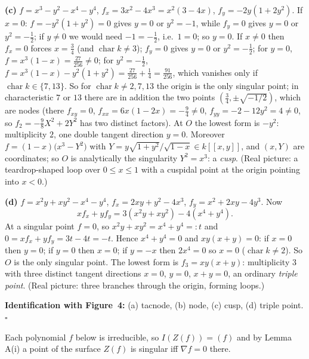 \documentclass[11pt]{article}
\begin{document}
\textbf{(c)} $f=x^3-y^2-x^4-y^4$, $f_x=3x^2-4x^3=x^2(3-4x)$, $f_y=-2y(1+2y^2)$. If $x=0$: $f=-y^2(1+y^2)=0$ gives $y=0$ or $y^2=-1$, while $f_y=0$ gives $y=0$ or $y^2=-\tfrac12$; if $y\ne0$ we would need $-1=-\tfrac12$, i.e.\ $1=0$; so $y=0$. If $x\ne0$ then $f_x=0$ forces $x=\tfrac34$ (and $\operatorname{char}k\neq3$); $f_y=0$ gives $y=0$ or $y^2=-\tfrac12$; for $y=0$, $f=x^3(1-x)=\tfrac{27}{256}\ne0$; for $y^2=-\tfrac12$, $f=x^3(1-x)-y^2(1+y^2)=\tfrac{27}{256}+\tfrac14=\tfrac{91}{256}$, which vanishes only if $\operatorname{char}k\in\{7,13\}$. So for $\operatorname{char}k\ne2,7,13$ the origin is the only singular point; in characteristic $7$ or $13$ there are in addition the two points $(\tfrac34,\pm\sqrt{-1/2})$, which are nodes (there $f_{xy}=0$, $f_{xx}=6x(1-2x)=-\tfrac94\neq0$, $f_{yy}=-2-12y^2=4\neq0$, so $f_2=-\tfrac98X^2+2Y^2$ has two distinct factors). At $O$ the lowest form is $-y^2$: multiplicity $2$, one double tangent direction $y=0$. Moreover $f=(1-x)\bigl(x^3-Y^2\bigr)$ with $Y=y\sqrt{1+y^2}/\sqrt{1-x}\in k[[x,y]]$, and $(x,Y)$ are coordinates; so $O$ is analytically the singularity $Y^2=x^3$: a \emph{cusp}. (Real picture: a teardrop-shaped loop over $0\le x\le1$ with a cuspidal point at the origin pointing into $x<0$.)

\textbf{(d)} $f=x^2y+xy^2-x^4-y^4$, $f_x=2xy+y^2-4x^3$, $f_y=x^2+2xy-4y^3$. Now
\[
xf_x+yf_y=3(x^2y+xy^2)-4(x^4+y^4).
\]
At a singular point $f=0$, so $x^2y+xy^2=x^4+y^4=:t$ and $0=xf_x+yf_y=3t-4t=-t$. Hence $x^4+y^4=0$ and $xy(x+y)=0$: if $x=0$ then $y=0$; if $y=0$ then $x=0$; if $y=-x$ then $2x^4=0$ so $x=0$ ($\operatorname{char}k\neq2$). So $O$ is the only singular point. The lowest form is $f_3=xy(x+y)$: multiplicity $3$ with three distinct tangent directions $x=0$, $y=0$, $x+y=0$, an ordinary \emph{triple point}. (Real picture: three branches through the origin, forming loops.)

\textbf{Identification with Figure~4:} (a) tacnode, (b) node, (c) cusp, (d) triple point. \hfill$\square$

\pf
Each polynomial $f$ below is irreducible, so $I(Z(f))=(f)$ and by Lemma A(i) a point of the surface $Z(f)$ is singular iff $\nabla f=0$ there.
\end{document}
